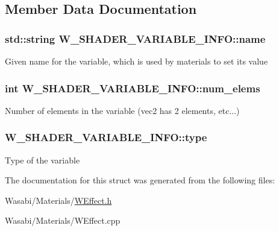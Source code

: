 \subsection{Member Data Documentation}
\subsubsection[{\texorpdfstring{name}{name}}]{\setlength{\rightskip}{0pt plus 5cm}std\+::string W\+\_\+\+S\+H\+A\+D\+E\+R\+\_\+\+V\+A\+R\+I\+A\+B\+L\+E\+\_\+\+I\+N\+F\+O\+::name}\hypertarget{struct_w___s_h_a_d_e_r___v_a_r_i_a_b_l_e___i_n_f_o_a6c7ea051bec0e855ef7531ac619eacc4}{}\label{struct_w___s_h_a_d_e_r___v_a_r_i_a_b_l_e___i_n_f_o_a6c7ea051bec0e855ef7531ac619eacc4}
Given name for the variable, which is used by materials to set its value 
\subsubsection[{\texorpdfstring{num\+\_\+elems}{num_elems}}]{\setlength{\rightskip}{0pt plus 5cm}int W\+\_\+\+S\+H\+A\+D\+E\+R\+\_\+\+V\+A\+R\+I\+A\+B\+L\+E\+\_\+\+I\+N\+F\+O\+::num\+\_\+elems}\hypertarget{struct_w___s_h_a_d_e_r___v_a_r_i_a_b_l_e___i_n_f_o_a76488ce65cd829ddc892ebd86560b889}{}\label{struct_w___s_h_a_d_e_r___v_a_r_i_a_b_l_e___i_n_f_o_a76488ce65cd829ddc892ebd86560b889}
Number of elements in the variable (vec2 has 2 elements, etc...) 
\subsubsection[{\texorpdfstring{type}{type}}]{ W\+\_\+\+S\+H\+A\+D\+E\+R\+\_\+\+V\+A\+R\+I\+A\+B\+L\+E\+\_\+\+I\+N\+F\+O\+::type}\hypertarget{struct_w___s_h_a_d_e_r___v_a_r_i_a_b_l_e___i_n_f_o_a8dd6afc8a043c57343a7e401dffaaa0b}{}\label{struct_w___s_h_a_d_e_r___v_a_r_i_a_b_l_e___i_n_f_o_a8dd6afc8a043c57343a7e401dffaaa0b}
Type of the variable 

The documentation for this struct was generated from the following files\+:\begin{DoxyCompactItemize}
\item 
Wasabi/\+Materials/\hyperlink{_w_effect_8h}{W\+Effect.\+h}\item 
Wasabi/\+Materials/W\+Effect.\+cpp\end{DoxyCompactItemize}
